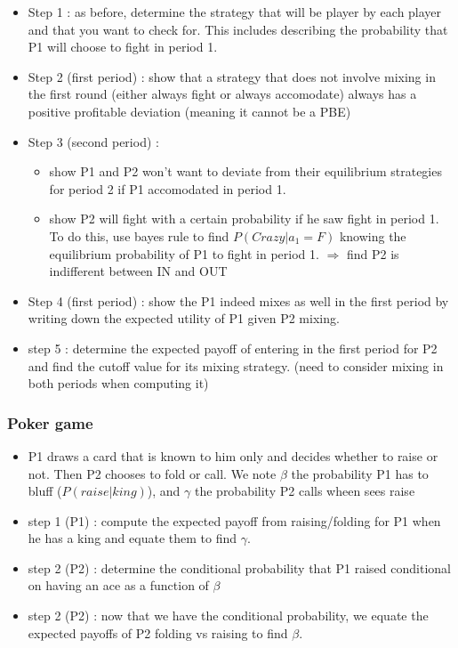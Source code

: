 \documentclass{article}
\begin{document}
\begin{itemize}
    \item Step 1 : as before, determine the strategy that will be player by each player and that you want to check for. This includes describing the probability that P1 will choose to fight in period 1. 
    \item Step 2 (first period) : show that a strategy that does not involve mixing in the first round (either always fight or always accomodate) always has a positive profitable deviation (meaning it cannot be a PBE)
    \item Step 3 (second period) : 
    \begin{itemize}
        \item show P1 and P2 won't want to deviate from their equilibrium strategies for period 2 if P1 accomodated in period 1.  
        \item show P2 will fight with a certain probability if he saw fight in period 1. To do this, use bayes rule to find $P(Crazy|a_1=F)$ knowing the equilibrium probability of P1 to fight in period 1. $\Rightarrow$ find P2 is indifferent between IN and OUT
    \end{itemize}
    \item Step 4 (first period) : show the P1 indeed mixes as well in the first period by writing down the expected utility of P1 given P2 mixing. 
    \item step 5 : determine the expected payoff of entering in the first period for P2 and find the cutoff value for its mixing strategy.  (need to consider mixing in both periods when computing it)
\end{itemize}


\subsubsection{Poker game}
\begin{itemize}
    \item P1 draws a card that is known to him only and decides whether to raise or not. Then P2 chooses to fold or call. We note $\beta$ the probability P1 has to bluff ($P(raise|king)$), and $\gamma$ the probability P2 calls wheen sees raise
    \item step 1 (P1) : compute the expected payoff from raising/folding for P1 when he has a king and equate them to find $\gamma$.
    \item step 2 (P2) : determine the conditional probability that P1 raised conditional on having an ace as a function of $\beta$
    \item step 2 (P2) : now that we have the  conditional probability, we equate the expected payoffs of P2 folding vs raising to find $\beta$.
\end{itemize}
\end{document}
